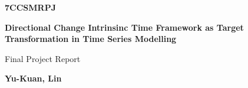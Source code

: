 \begin{titlepage}
    \begin{center}

        \vspace*{6cm}

        {\Huge \textbf{7CCSMRPJ}} \\

        \vspace*{0.5cm}

        {\Huge \textbf{Directional Change Intrinsinc Time Framework as Target Transformation in Time Series Modelling}} \\

        \vspace*{1.5cm}

        Final Project Report \\
        
        \vspace*{2.5cm}

        \textbf{Yu-Kuan, Lin}
    
    \end{center}
\end{titlepage}
